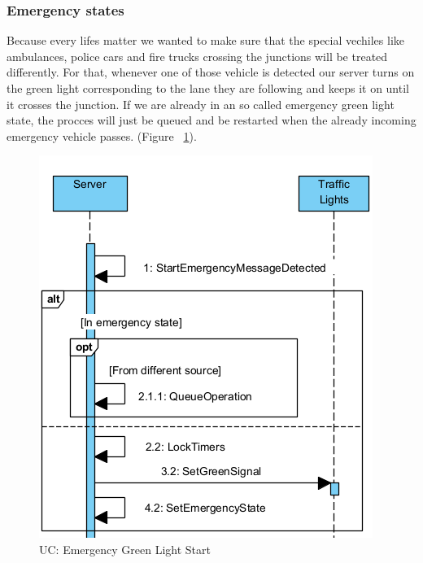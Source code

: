 \documentclass[17pt]{article}
\begin{document}
\pagebreak
\subsubsection{Emergency states}
\indent \indent
Because every lifes matter we wanted to make sure that the
special vechiles like ambulances, police cars and fire trucks
crossing the junctions will be treated differently. For that,
whenever one of those vehicle is detected our server turns on
the green light corresponding to the lane they are following
and keeps it on until it crosses the junction. If we are already
in an so called emergency green light state, the procces will
just be queued and be restarted when the already incoming 
emergency vehicle passes. (Figure ~\ref{fig:UC_EmergencyGreenLightStart}).
\begin{figure}[h!]
    \includegraphics[width=\textwidth]{UC/EmergencyStart.png}
    \caption{UC: Emergency Green Light Start}
    \label{fig:UC_EmergencyGreenLightStart}
\end{figure}

\pagebreak
\end{document}
